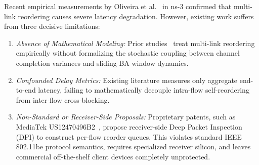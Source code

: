 \documentclass[10pt,journal,compsoc]{IEEEtran}
\begin{document}
Recent empirical measurements by Oliveira et al.~\cite{oliveira2026characterizing} in ns-3 confirmed that multi-link reordering causes severe latency degradation. However, existing work suffers from three decisive limitations:
\begin{enumerate}
    \item \emph{Absence of Mathematical Modeling:} Prior studies~\cite{oliveira2026characterizing,alhraishawi2022delay} treat multi-link reordering empirically without formalizing the stochastic coupling between channel completion variances and sliding BA window dynamics.
    \item \emph{Confounded Delay Metrics:} Existing literature measures only aggregate end-to-end latency, failing to mathematically decouple intra-flow self-reordering from inter-flow cross-blocking.
    \item \emph{Non-Standard or Receiver-Side Proposals:} Proprietary patents, such as MediaTek US12470496B2~\cite{mediatek2024reordering}, propose receiver-side Deep Packet Inspection (DPI) to construct per-flow reorder queues. This violates standard IEEE 802.11be protocol semantics, requires specialized receiver silicon, and leaves commercial off-the-shelf client devices completely unprotected.
\end{enumerate}
\end{document}
